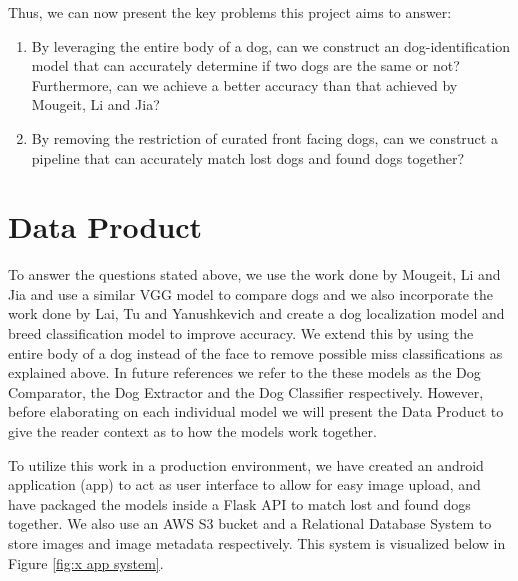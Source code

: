 \documentclass{article}
\begin{document}
Thus, we can now present the key problems this project aims to answer:

\begin{enumerate}
  \item By leveraging the entire body of a dog, can we construct an dog-identification model that can accurately determine if two dogs are the same or not?  Furthermore, can we achieve a better accuracy than that achieved by Mougeit, Li and Jia?
  \item By removing the restriction of curated front facing dogs, can we construct a pipeline that can accurately match lost dogs and found dogs together? 
\end{enumerate}

\section{Data Product}

	To answer the questions stated above, we use the work done by Mougeit, Li and Jia and use a similar VGG model to compare dogs and we also incorporate the work done by Lai, Tu and Yanushkevich and create a dog localization model and breed classification model to improve accuracy.   We extend this by using the entire body of a dog instead of the face to remove possible miss classifications as explained above.  In future references we refer to the these models as the Dog Comparator, the Dog Extractor and the Dog Classifier respectively.  However, before elaborating on each individual model we will present the Data Product to give the reader context as to how the models work together.

	To utilize this work in a production environment, we have created an android application (app) to act as user interface to allow for easy image upload, and have packaged the models inside a Flask API to match lost and found dogs together. We also use an AWS S3 bucket and a Relational Database System to store images and image metadata respectively.  This system is visualized below in Figure \ref{fig:x app system}.
\end{document}
